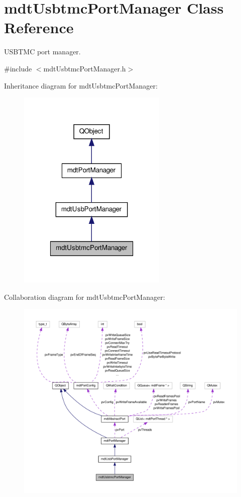 \hypertarget{classmdt_usbtmc_port_manager}{\section{mdt\-Usbtmc\-Port\-Manager Class Reference}
\label{classmdt_usbtmc_port_manager}
}


U\-S\-B\-T\-M\-C port manager.  




{\ttfamily \#include $<$mdt\-Usbtmc\-Port\-Manager.\-h$>$}



Inheritance diagram for mdt\-Usbtmc\-Port\-Manager\-:\nopagebreak
\begin{figure}[H]
\begin{center}
\leavevmode
\includegraphics[width=202pt]{classmdt_usbtmc_port_manager__inherit__graph}
\end{center}
\end{figure}


Collaboration diagram for mdt\-Usbtmc\-Port\-Manager\-:\nopagebreak
\begin{figure}[H]
\begin{center}
\leavevmode
\includegraphics[width=350pt]{classmdt_usbtmc_port_manager__coll__graph}
\end{center}
\end{figure}
